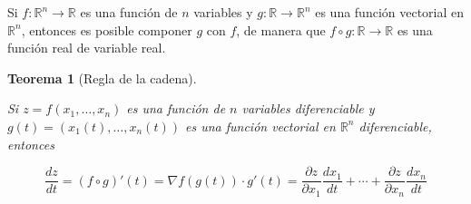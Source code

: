 \documentclass[
  a4paper,
]{scrreport}
\theoremstyle{definition}
\theoremstyle{definition}
\theoremstyle{definition}
\theoremstyle{plain}
\newtheorem{theorem}{Teorema}[chapter]
\theoremstyle{plain}
\theoremstyle{plain}
\theoremstyle{remark}
\begin{document}
Si \(f:\mathbb{R}^n\rightarrow \mathbb{R}\) es una función de \(n\)
variables y \(g:\mathbb{R}\rightarrow \mathbb{R}^n\) es una función
vectorial en \(\mathbb{R}^n\), entonces es posible componer \(g\) con
\(f\), de manera que \(f\circ g:\mathbb{R}\rightarrow \mathbb{R}\) es
una función real de variable real.

\begin{theorem}[Regla de la
cadena]\protect\hypertarget{thm-regla-cadena-funciones-varias-variables}{}\label{thm-regla-cadena-funciones-varias-variables}

Si \(z=f(x_1,\ldots,x_n)\) es una función de \(n\) variables
diferenciable y \(g(t)=(x_1(t),\ldots,x_n(t))\) es una función vectorial
en \(\mathbb{R}^n\) diferenciable, entonces

\[
\frac{dz}{dt} = (f\circ g)'(t) = \nabla f(g(t))\cdot g'(t) = \frac{\partial z}{\partial x_1}\frac{dx_1}{dt} + \cdots +\frac{\partial z}{\partial x_n}\frac{dx_n}{dt}
\]

\end{theorem}
\end{document}
